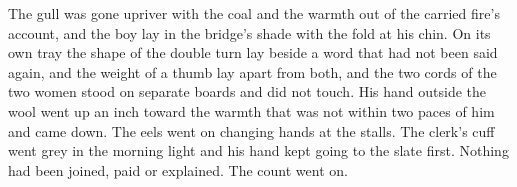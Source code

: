 The gull was gone upriver with the coal and the warmth out of the carried fire's account, and the boy lay in the bridge's shade with the fold at his chin. On its own tray the shape of the double turn lay beside a word that had not been said again, and the weight of a thumb lay apart from both, and the two cords of the two women stood on separate boards and did not touch. His hand outside the wool went up an inch toward the warmth that was not within two paces of him and came down. The eels went on changing hands at the stalls. The clerk's cuff went grey in the morning light and his hand kept going to the slate first. Nothing had been joined, paid or explained. The count went on.
